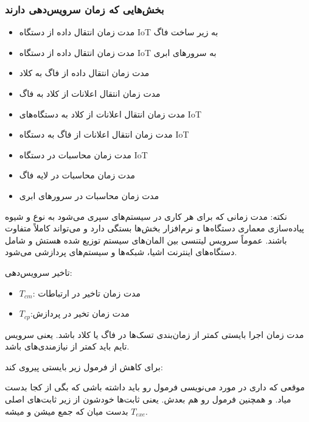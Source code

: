 \documentclass[a4paper]{article}
\begin{document}
\subsubsection{بخش‌هایی که زمان سرویس‌دهی دارند}

\begin{itemize}
    \item مدت زمان انتقال داده از دستگاه IoT به زیر ساخت فاگ
    \item مدت زمان انتقال داده از دستگاه IoT به سرور‌های ابری
    \item مدت زمان انتقال داده از فاگ به کلاد
    \item مدت زمان انتقال اعلانات از کلاد به فاگ
    \item مدت زمان انتقال اعلانات از کلاد به دستگاه‌های IoT
    \item مدت زمان انتقال اعلانات از فاگ به دستگاه IoT
    \item مدت زمان محاسبات در دستگاه IoT
    \item مدت زمان محاسبات در لایه فاگ
    \item مدت زمان محاسبات در سرور‌های ابری
\end{itemize}

نکته: مدت زمانی که برای هر کاری در سیستم‌های  سپری می‌شود به نوع و شیوه
پیاده‌سازی معماری دستگاه‌ها و نرم‌افزار بخش‌ها بستگی دارد و می‌تواند کاملاً
متفاوت باشند. عموماً سرویس لیتنسی بین المان‌های سیستم  توزیع شده هستش و
شامل دستگاه‌های اینترنت اشیا، شبکه‌ها و سیستم‌های پردازشی می‌شود.

تاخیر سرویس‌دهی:


\begin{itemize}
    \item $T_{cm}$: مدت زمان تاخیر در ارتباطات
    \item $T_{cp}$:مدت زمان تخیر در پردازش
\end{itemize}

مدت زمان اجرا بایستی کمتر از زمان‌بندی تسک‌ها در فاگ یا کلاد باشد. یعنی سرویس
تایم باید کمتر از نیازمندی‌های  باشد.

برای کاهش  از فرمول زیر بایستی پیروی کند:


موقعی که داری در مورد  می‌نویسی فرمول  رو باید داشته باشی که بگی از کجا بدست میاد. و همچنین فرمول
 رو هم بعدش. یعنی ثابت‌ها خودشون از زیر ثابت‌های اصلی
بدست میان که جمع میشن و میشه $T_{exe}$.
\end{document}
